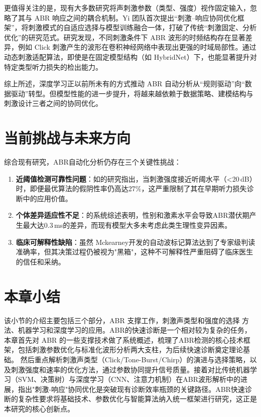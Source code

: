 更值得关注的是，现有大多数研究将声刺激参数（类型、强度）视作固定输入，忽略了其与 ABR 响应之间的耦合机制。Yi 团队首次提出“刺激–响应协同优化框架”，将刺激模式的自适应选择与模型训练融合一体，打破了传统“刺激固定、分析优化”的研究范式。研究发现，不同刺激条件下 ABR 波形的时频结构存在显著差异，例如 Click 刺激产生的波形在卷积神经网络中表现出更强的时域局部性。通过动态刺激适配算法，即使是在固定模型结构（如 HybridNet）下，也能显著提升对特定类型听力损失的检出能力。

综上所述，深度学习正以前所未有的方式推动 ABR 自动分析从“规则驱动”向“数据驱动”转型。但模型性能的进一步提升，将越来越依赖于数据策略、建模结构与刺激设计三者之间的协同优化。

\section{当前挑战与未来方向}
综合现有研究，ABR自动化分析仍存在三个关键性挑战：

\begin{enumerate}
    \item \textbf{近阈值检测可靠性问题}：如\cite{shaheen2024abrpresto}的研究指出，当刺激强度接近听阈水平（<20\,dB）时，即便最优算法的假阴性率仍高达27\%，这严重限制了其在早期听力损失诊断中的应用价值。
    
    \item \textbf{个体差异适应性不足}：\cite{aloufi2023sex}的系统综述表明，性别和激素水平会导致ABR潜伏期产生最大达0.3\,ms的差异，而现有模型大多未考虑此类生理性变异因素。
    
    \item \textbf{临床可解释性缺陷}：虽然 Mckearney\cite{mckearney2025automated}开发的自动波标记算法达到了专家级判读准确率，但其决策过程仍被视为"黑箱"，这种不可解释性严重阻碍了临床医生的信任和采纳。
\end{enumerate}

\section{本章小结}
该小节的介绍主要包括三个部分，ABR 支撑工作，刺激声类型和强度的选择 方法、机器学习和深度学习的应用。ABR的快速诊断是一个相对较为复杂的任务，本章首先对 ABR 的一些支撑技术做了系统概述，梳理了ABR检测的核心技术框架，包括刺激参数优化与标准化波形分析两大支柱，为后续快速诊断奠定理论基础。
然后重点解析刺激声类型（Click/Tone-Burst/Chirp）的演进与选择策略，以及刺激强度和速率的优化方法，通过参数协同提升信号质量。接着对比传统机器学习（SVM、决策树）与深度学习（CNN、注意力机制）在ABR波形解析中的进展，指出"刺激-响应"协同优化是突破现有诊断效率瓶颈的关键路径。ABR快速诊断的复杂性要求将基础技术、参数优化与智能算法纳入统一框架进行研究，这正是本研究的核心创新点。
